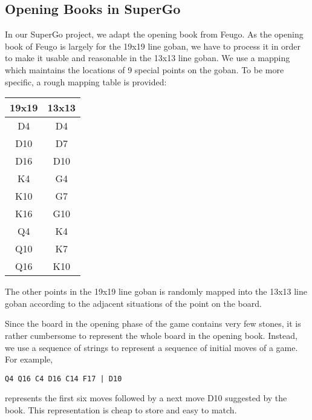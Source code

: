 \subsection{Opening Books in SuperGo}

In our SuperGo project, we adapt the opening book from Feugo. As the opening book of Feugo is largely for the 19x19 line goban, we have to process it in order to make it usable and reasonable in the 13x13 line goban. We use a mapping which maintains the locations of 9 special points on the goban. To be more specific, a rough mapping table is provided:

\begin{center}
\begin{tabular}{c|c}

19x19 & 13x13 \\ \hline
D4 & D4 \\
D10 & D7 \\
D16 & D10 \\
K4 & G4 \\
K10 & G7 \\
K16 & G10 \\
Q4 & K4 \\
Q10 & K7 \\
Q16 & K10 \\
\end{tabular}
\end{center}

The other points in the 19x19 line goban is randomly mapped into the 13x13 line goban according to the adjacent situations of the point on the board.

Since the board in the opening phase of the game contains very few stones, it is rather cumbersome to represent the whole board in the opening book. Instead, we use a sequence of strings to represent a sequence of initial moves of a game. For example,
\begin{verbatim}
Q4 Q16 C4 D16 C14 F17 | D10
\end{verbatim}
represents the first six moves followed by a next move D10 suggested by the book. This representation is cheap to store and easy to match.
